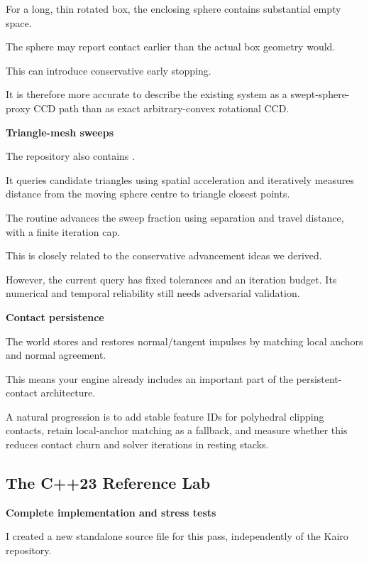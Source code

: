 For a long, thin rotated box, the enclosing sphere contains substantial empty space.

The sphere may report contact earlier than the actual box geometry would.

This can introduce conservative early stopping.

It is therefore more accurate to describe the existing system as a swept-sphere-proxy CCD path than as exact arbitrary-convex rotational CCD.

\textbf{Triangle-mesh sweeps}

The repository also contains .

It queries candidate triangles using spatial acceleration and iteratively measures distance from the moving sphere centre to triangle closest points.

The routine advances the sweep fraction using separation and travel distance, with a finite iteration cap.

This is closely related to the conservative advancement ideas we derived.

However, the current query has fixed tolerances and an iteration budget. Its numerical and temporal reliability still needs adversarial validation.

\textbf{Contact persistence}

The world stores and restores normal/tangent impulses by matching local anchors and normal agreement.

This means your engine already includes an important part of the persistent-contact architecture.

A natural progression is to add stable feature IDs for polyhedral clipping contacts, retain local-anchor matching as a fallback, and measure whether this reduces contact churn and solver iterations in resting stacks.

\subsection{The C++23 Reference Lab}\label{04-visual-computing-ii-ch026-the-c23-reference-lab}

\hypertarget{04-visual-computing-ii-ch026-the-c23-reference-lab}{}

\textbf{Complete implementation and stress tests}

I created a new standalone source file for this pass, independently of the Kairo repository.

